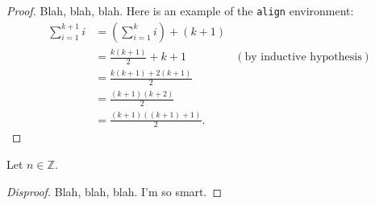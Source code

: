 \documentclass[11pt]{article}
\newcommand{\Z}{\mathbb{Z}}
\newenvironment{proposition}[2][Proposition]{\begin{trivlist}
\item[\hskip \labelsep {\bfseries #1}\hskip \labelsep {\bfseries #2.}]}{\end{trivlist}}
\begin{document}
\begin{proof}
Blah, blah, blah.  Here is an example of the \texttt{align} environment:
\begin{align*}
\sum_{i=1}^{k+1}i & = \left(\sum_{i=1}^{k}i\right) +(k+1)\\ 
& = \frac{k(k+1)}{2}+k+1 & (\text{by inductive hypothesis})\\
& = \frac{k(k+1)+2(k+1)}{2}\\
& = \frac{(k+1)(k+2)}{2}\\
& = \frac{(k+1)((k+1)+1)}{2}.
\end{align*}
\end{proof}
 
\begin{proposition}{x.yz}
Let $n\in \Z$.  
\end{proposition}
 
\begin{proof}[Disproof]%
Blah, blah, blah.  I'm so smart.
\end{proof}
 
 
\end{document}
